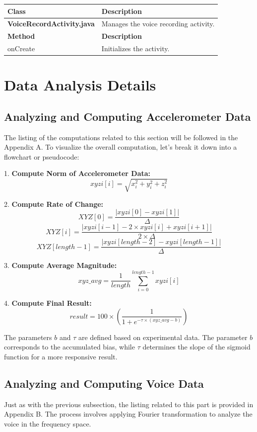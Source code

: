 \documentclass[12pt,a4paper]{article}
\begin{document}
\begin{longtable}{|p{5cm}|p{10cm}|}
\hline
\textbf{Class} & \textbf{Description} \\
\hline
\textbf{VoiceRecordActivity.java} & Manages the voice recording activity. \\
\hline
\textbf{Method} & \textbf{Description} \\
\hline
onCreate & Initializes the activity. \\
\hline
\end{longtable}

\section{Data Analysis Details}

\subsection{Analyzing and Computing Accelerometer Data}

The listing of the computations related to this section will be followed in the Appendix A.
To visualize the overall computation, let's break it down into a flowchart or pseudocode:

1. \textbf{Compute Norm of Accelerometer Data:}
\[ xyzi[i] = \sqrt{x_i^2 + y_i^2 + z_i^2} \]


2. \textbf{Compute Rate of Change:}
\[ XYZ[0] = \frac{|xyzi[0] - xyzi[1]|}{\Delta} \]
\[ XYZ[i] = \frac{|xyzi[i-1] - 2 \times xyzi[i] + xyzi[i+1]|}{2 \times \Delta} \]
\[ XYZ[length - 1] = \frac{|xyzi[length - 2] - xyzi[length - 1]|}{\Delta} \]

3. \textbf{Compute Average Magnitude:}
\[ xyz\_avg = \frac{1}{length} \sum_{i=0}^{length-1} xyzi[i] \]

4. \textbf{Compute Final Result:}
\[ result = 100 \times \left( \frac{1}{1 + e^{-\tau \times (xyz\_avg - b)}} \right) \]

The parameters \( b \) and \( \tau \) are defined based on experimental data. The parameter \( b \) corresponds to the accumulated bias, while \( \tau \) determines the slope of the sigmoid function for a more responsive result.

\subsection{Analyzing and Computing Voice Data}

Just as with the previous subsection, the listing related to this part is provided in Appendix B.
The process involves applying Fourier transformation to analyze the voice in the frequency space.
\end{document}
